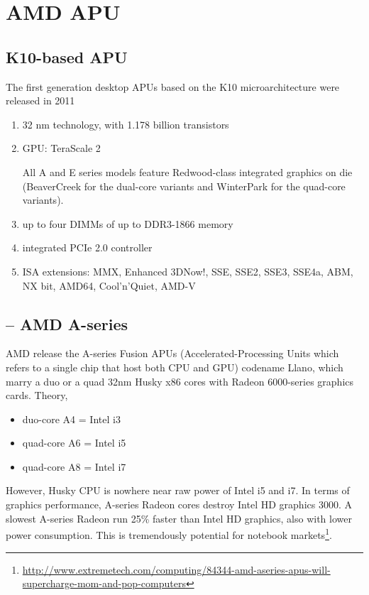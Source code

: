 \section{AMD APU}
\label{sec:APU-AMD}

\subsection{K10-based APU}

The first generation desktop APUs based on the K10 microarchitecture were released in 2011
\begin{enumerate}
  \item  32 nm technology, with 1.178 billion transistors
  
  \item GPU: TeraScale 2
  
  All A and E series models feature Redwood-class integrated graphics on die
  (BeaverCreek for the dual-core variants and WinterPark for the quad-core
  variants).
  
  \item up to four DIMMs of up to DDR3-1866 memory
  
  \item integrated PCIe 2.0 controller
  
  \item ISA extensions: MMX, Enhanced 3DNow!, SSE, SSE2, SSE3, SSE4a, ABM, NX bit, AMD64, Cool'n'Quiet, AMD-V
  
\end{enumerate}

\subsection{-- AMD A-series}
\label{sec:APU-A-series}

AMD release the A-series Fusion APUs (Accelerated-Processing Units
which refers to a single chip that host both CPU and GPU)
codename Llano, which marry a duo or a quad 32nm Husky x86 cores with
Radeon 6000-series graphics cards. Theory,
\begin{itemize}
\item duo-core A4 = Intel i3
\item quad-core A6 = Intel i5
\item quad-core A8 = Intel i7
\end{itemize}
However, Husky CPU is nowhere near raw power of Intel i5 and i7. In
terms of graphics performance, A-series Radeon cores destroy Intel HD
graphics 3000. A slowest A-series Radeon run 25\% faster than Intel HD
graphics, also with lower power consumption. This is tremendously
potential for notebook
markets\footnote{\url{http://www.extremetech.com/computing/84344-amd-aseries-apus-will-supercharge-mom-and-pop-computers}}.

